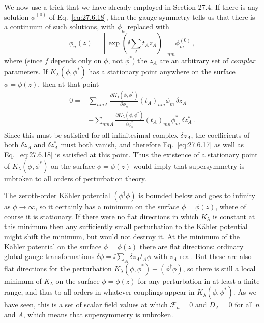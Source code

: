 We now use a trick that we have already employed in Section 27.4. If there is
any solution \(\phi^{(0)}\) of Eq.~\eqref{eq:27.6.18}, then the gauge
symmetry tells us that there is a continuum of such solutions, with
\(\phi_n\) replaced with
\begin{equation}
  \phi_n(z)
  =
  \left[
    \exp\left(\ii\sum_A t_Az_A\right)
  \right]_{nm}
  \phi_m^{(0)}\,,
  \tag{27.6.20}\label{eq:27.6.20}
\end{equation}
where (since \(f\) depends only on \(\phi\), not \(\phi^*\)) the \(z_A\)
are an arbitrary set of \emph{complex} parameters. If
\(K_\lambda(\phi,\phi^*)\) has a stationary point anywhere on the surface
\(\phi=\phi(z)\), then at that point
\begin{equation}
  \begin{aligned}
  0={}&
  \sum_{nmA}
  \frac{\partial K_\lambda(\phi,\phi^*)}{\partial\phi_n}
  (t_A)_{nm}\phi_m\,\delta z_A
  \\
  &-
  \sum_{nmA}
  \frac{\partial K_\lambda(\phi,\phi^*)}{\partial\phi_n^*}
  (t_A)_{mn}\phi_m^*\,\delta z_A^*\,.
  \end{aligned}
  \tag{27.6.21}\label{eq:27.6.21}
\end{equation}
Since this must be satisfied for all infinitesimal complex \(\delta z_A\),
the coefficients of both \(\delta z_A\) and \(\delta z_A^*\) must both
vanish, and therefore Eq.~\eqref{eq:27.6.17} as well as
Eq.~\eqref{eq:27.6.18} is satisfied at this point. Thus the existence of a
stationary point of \(K_\lambda(\phi,\phi^*)\) on the surface
\(\phi=\phi(z)\) would imply that supersymmetry is unbroken to all orders of
perturbation theory.

The zeroth-order K\"ahler potential \((\phi^\dagger\phi)\) is bounded below
and goes to infinity as \(\phi\longrightarrow\infty\), so it certainly has a
minimum on the surface \(\phi=\phi(z)\), where of course it is stationary.
If there were no flat directions in which \(K_\lambda\) is constant at this
minimum then any sufficiently small perturbation to the K\"ahler potential
might shift the minimum, but would not destroy it. At the minimum of the
K\"ahler potential on the surface \(\phi=\phi(z)\) there are flat
directions: ordinary global gauge transformations
\(\delta\phi=\ii\sum_A\delta z_A t_A\phi\) with \(z_A\) real. But these are
also flat directions for the perturbation
\(K_\lambda(\phi,\phi^*)-(\phi^\dagger\phi)\), so there is still a local
minimum of \(K_\lambda\) on the surface \(\phi=\phi(z)\) for any
perturbation in at least a finite range, and thus to all orders in whatever
couplings appear in \(K_\lambda(\phi,\phi^*)\). As we have seen, this is a
set of scalar field values at which \(\mathcal{F}_n=0\) and \(D_A=0\) for
all \(n\) and \(A\), which means that supersymmetry is unbroken.

